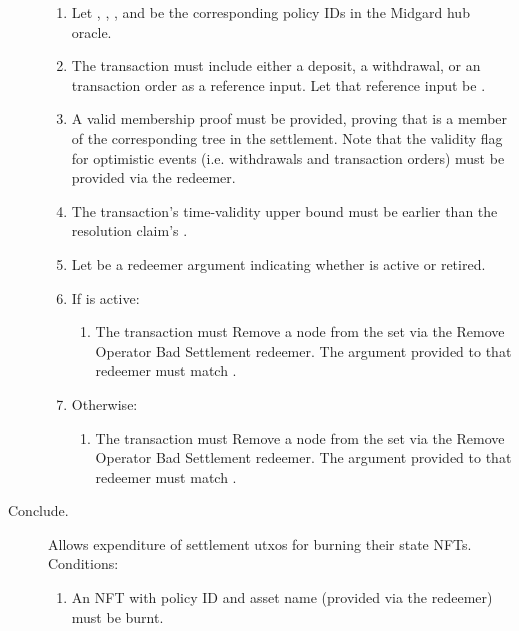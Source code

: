 \documentclass[../midgard.tex]{subfiles}
\begin{document}
\begin{description}
\begin{enumerate}
        \item Let , , , and  be the corresponding policy IDs in the Midgard hub oracle.
        \item The transaction must include either a deposit, a withdrawal, or an transaction order as a reference input.
          Let that reference input be .
        \item A valid membership proof must be provided, proving that  is a member of the corresponding tree in the settlement.
          Note that the validity flag for optimistic events (i.e. withdrawals and transaction orders) must be provided via the redeemer.
        \item The transaction's time-validity upper bound must be earlier than the resolution claim's .
        \item Let  be a redeemer argument indicating whether  is active or retired.
        \item If  is active:
            \begin{enumerate}
                \item The transaction must Remove a node from the  set via the Remove Operator Bad Settlement redeemer.
                  The  argument provided to that redeemer must match .
            \end{enumerate}
        \item Otherwise:
            \begin{enumerate}
                \item The transaction must Remove a node from the  set via the Remove Operator Bad Settlement redeemer.
                  The  argument provided to that redeemer must match .
            \end{enumerate}
      \end{enumerate}
  \item[Conclude.] Allows expenditure of settlement utxos for burning their state NFTs.
    Conditions:
      \begin{enumerate}
        \item An NFT with policy ID  and asset name  (provided via the redeemer) must be burnt.
      \end{enumerate}
\end{description}
\end{document}
